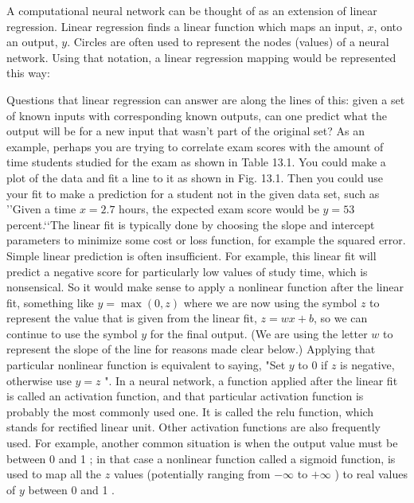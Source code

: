 \documentclass{book}
\theoremstyle{plain}
\theoremstyle{definition}
\numberwithin{exm}{chapter}
\theoremstyle{remark}
\theoremstyle{summary}
\theoremstyle{overview}
\begin{document}
A computational neural network can be thought of as an extension of linear regression. Linear regression finds a linear function which maps an input, $x$, onto an output, $y$. Circles are often used to represent the nodes (values) of a neural network. Using that notation, a linear regression mapping would be represented this way:

Questions that linear regression can answer are along the lines of this: given a set of known inputs with corresponding known outputs, can one predict what the output will be for a new input that wasn't part of the original set? As an example, perhaps you are trying to correlate exam scores with the amount of time students studied for the exam as shown in Table 13.1.
You could make a plot of the data and fit a line to it as shown in Fig. 13.1. Then you could use your fit to make a prediction for a student not in the given data set, such as \rq\rq Given a time $x=2.7$ hours, the expected exam score would be $y=53$ percent.\lq\lq The linear fit is typically done by choosing the slope and intercept parameters to minimize some cost or loss function, for example the squared error.\\

Simple linear prediction is often insufficient. For example, this linear fit will predict a negative score for particularly low values of study time, which is nonsensical. So it would make sense to apply a nonlinear function after the linear fit, something like $y=\max (0, z)$ where we are now using the symbol $z$ to represent the value that is given from the linear fit, $z=w x+b$, so we can continue to use the symbol $y$ for the final output. (We are using the letter $w$ to represent the slope of the line for reasons made clear below.) Applying that particular nonlinear function is equivalent to saying, "Set $y$ to 0 if $z$ is negative, otherwise use $y=z$ ".
In a neural network, a function applied after the linear fit is called an activation function, and that particular activation function is probably the most commonly used one. It is called the relu function, which stands for rectified linear unit. Other activation functions are also frequently used. For example, another common situation is when the output value must be between 0 and 1 ; in that case a nonlinear function called a sigmoid function, is used to map all the $z$ values (potentially ranging from $-\infty$ to $+\infty$ ) to real values of $y$ between 0 and 1 .
\end{document}
